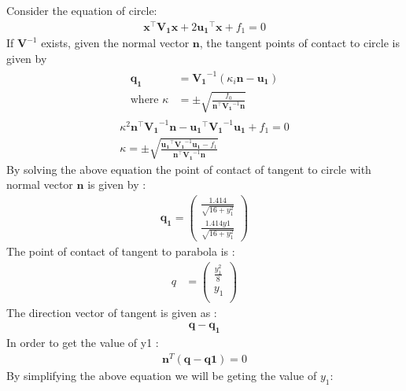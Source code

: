 \documentclass[journal,10pt,twocolumn]{article}
\let\vec\mathbf
\providecommand{\brak}[1]{\ensuremath{\left(#1\right)}}
\begin{document}
Consider the equation of circle:
\begin{align}
\vec{x}^{\top}\vec{V_1}\vec{x}+2\vec{u_1}^{\top}\vec{x}+f_1=0
\end{align}
  If $\vec{V}^{-1}$ exists, given the normal vector $\vec{n}$, the tangent points of contact to circle  is given by
\begin{align}
  \begin{split}
\vec{q_1} &= \vec{V_1}^{-1}\brak{\kappa_i \vec{n}-\vec{u_1}}
\\
\text{where }\kappa &= \pm \sqrt{
\frac{
f_0
}
{
\vec{n}^{\top}\vec{V_1}^{-1}\vec{n}
}
}
  \end{split}
\label{eq:conic_tangent_qk}
\end{align}
\begin{align}
\kappa^2 \vec{n}^{\top}\vec{V_1}^{-1}\vec{n} - \vec{u_1}^{\top}\vec{V_1}^{-1}\vec{u_1} + f_1 =0 \\
\kappa = \pm \sqrt{
\frac{
\vec{u_1}^{\top}\vec{V_1}^{-1}\vec{u_1}-f_1
}
{
\vec{n}^{\top}\vec{V_1}^{-1}\vec{n}
}
}
\end{align}
By solving the above equation the point of contact of tangent to circle with normal vector $\vec{n}$ is given by :
\begin{align}
\vec{q_1} = 
\begin{pmatrix}
\frac{1.414}{\sqrt{16+y_1^2}} \\
\frac{1.414y1}{\sqrt{16+y_1^2}} 
\end{pmatrix}
\end{align}
The point of contact of tangent to parabola is :
\begin{align}
q&=
\begin{pmatrix}
\frac{y_1^2}{8} \\
 y_1 \\
\end{pmatrix}
\end{align}
The direction vector of tangent is given as :
\begin{align}
\vec{q}-\vec{q_1}
\end{align}
In order to get the value of y1 :
\begin{align}
\vec{n}^T(\vec{q}-\vec{q1})=0
\end{align}
By simplifying the above equation we will be geting the value of $y_1$:
\end{document}
